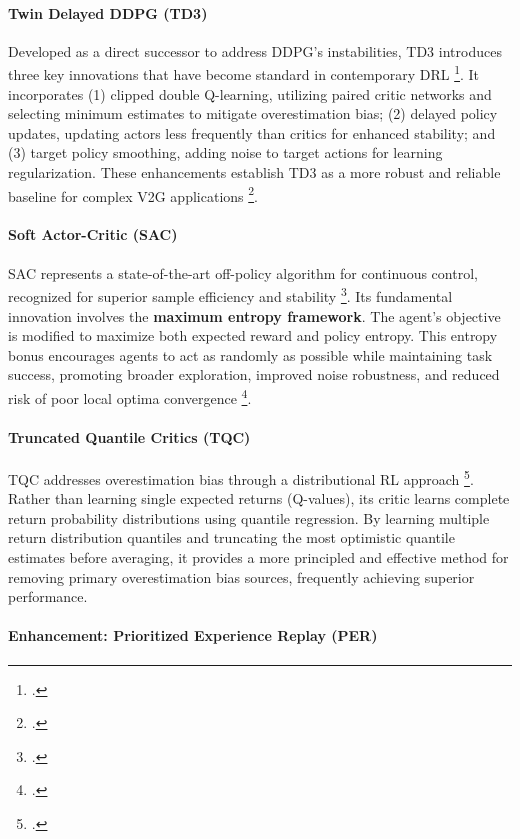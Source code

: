 \paragraph{Twin Delayed DDPG (TD3)}

Developed as a direct successor to address DDPG's instabilities, TD3 introduces three key innovations that have become standard in contemporary DRL \footcite{fujimoto2018addressing}. It incorporates (1) clipped double Q-learning, utilizing paired critic networks and selecting minimum estimates to mitigate overestimation bias; (2) delayed policy updates, updating actors less frequently than critics for enhanced stability; and (3) target policy smoothing, adding noise to target actions for learning regularization. These enhancements establish TD3 as a more robust and reliable baseline for complex V2G applications \footcite{liu2023optimal, wang2022multi}.

\paragraph{Soft Actor-Critic (SAC)}

SAC represents a state-of-the-art off-policy algorithm for continuous control, recognized for superior sample efficiency and stability \footcite{haarnoja2019soft}. Its fundamental innovation involves the \textbf{maximum entropy framework}. The agent's objective is modified to maximize both expected reward and policy entropy. This entropy bonus encourages agents to act as randomly as possible while maintaining task success, promoting broader exploration, improved noise robustness, and reduced risk of poor local optima convergence \footcite{logeshwaran2022comparative}.

\paragraph{Truncated Quantile Critics (TQC)}

TQC addresses overestimation bias through a distributional RL approach \footcite{kuznetsov2020controlling}. Rather than learning single expected returns (Q-values), its critic learns complete return probability distributions using quantile regression. By learning multiple return distribution quantiles and truncating the most optimistic quantile estimates before averaging, it provides a more principled and effective method for removing primary overestimation bias sources, frequently achieving superior performance.

\paragraph{Enhancement: Prioritized Experience Replay (PER)}

